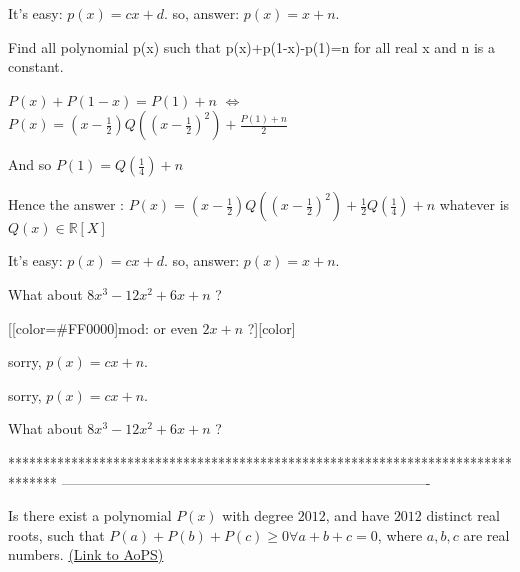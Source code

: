 \begin{solution}
	It's easy:  $p(x)=cx+d.$
   so,  answer: $p(x)=x+n.$
\end{solution}



\begin{solution}
	\begin{tcolorbox}Find all polynomial p(x) such that p(x)+p(1-x)-p(1)=n for all real x and n is a constant.\end{tcolorbox}
$P(x)+P(1-x)=P(1)+n$ $\iff$ $P(x)=(x-\frac 12)Q((x-\frac 12)^2)+\frac {P(1)+n}2$

And so $P(1)=Q(\frac 14)+n$

Hence the answer : $\boxed{P(x)=(x-\frac 12)Q((x-\frac 12)^2)+\frac 12Q(\frac 14)+n}$ whatever is $Q(x)\in\mathbb R[X]$
\end{solution}



\begin{solution}
	\begin{tcolorbox}It's easy:  $p(x)=cx+d.$
   so,  answer: $p(x)=x+n.$\end{tcolorbox}
What about $8x^3-12x^2+6x+n$ ?

[[color=#FF0000]mod: or even $2x+n$ ?][\/color]
\end{solution}



\begin{solution}
	sorry, $p(x)=cx+n.$
\end{solution}



\begin{solution}
	\begin{tcolorbox}sorry, $p(x)=cx+n.$\end{tcolorbox}
What about $8x^3-12x^2+6x+n$ ?
\end{solution}
*******************************************************************************
-------------------------------------------------------------------------------

\begin{problem}
	Is there exist a polynomial $P(x)$ with degree $2012$, and have $2012$ distinct real roots, such that $P(a) + P(b) + P(c) \ge 0 \forall a + b + c = 0 $, where   $a, b, c$ are real numbers.
	\flushright \href{https://artofproblemsolving.com/community/c6h543672}{(Link to AoPS)}
\end{problem}



